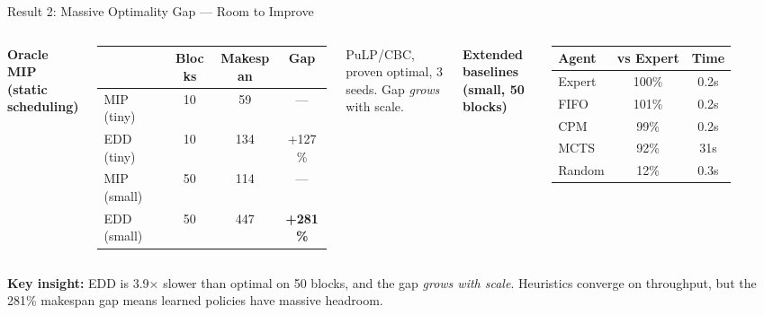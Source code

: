 \documentclass[aspectratio=169,12pt]{beamer}
\begin{document}
\begin{frame}{Result 2: Massive Optimality Gap --- Room to Improve}

\begin{columns}[T]
\textbf{Oracle MIP (static scheduling)}

\vspace{0.5em}
\begin{tabular}{lccc}
\toprule
& Blocks & Makespan & Gap \\
\midrule
MIP (tiny) & 10 & 59 & --- \\
EDD (tiny) & 10 & 134 & +127\% \\
\midrule
MIP (small) & 50 & 114 & --- \\
EDD (small) & 50 & 447 & \textbf{+281\%} \\
\bottomrule
\end{tabular}

\vspace{0.5em}
{\small PuLP/CBC, proven optimal, 3 seeds. Gap \textit{grows} with scale.}

\textbf{Extended baselines (small, 50 blocks)}

\vspace{0.5em}
\begin{tabular}{lcc}
\toprule
Agent & vs Expert & Time \\
\midrule
Expert & 100\% & 0.2s \\
FIFO & 101\% & 0.2s \\
CPM & 99\% & 0.2s \\
MCTS & 92\% & 31s \\
Random & 12\% & 0.3s \\
\bottomrule
\end{tabular}
\end{columns}

\vspace{1em}
\textbf{Key insight:} EDD is 3.9$\times$ slower than optimal on 50 blocks, and the gap \textit{grows with scale}. Heuristics converge on throughput, but the 281\% makespan gap means learned policies have massive headroom.
\end{frame}
\end{document}
